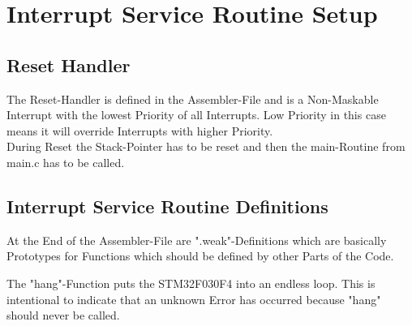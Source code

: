 \section{Interrupt Service Routine Setup}

\subsection{Reset Handler}

The Reset-Handler is defined in the Assembler-File and is a Non-Maskable Interrupt with the lowest Priority of all Interrupts.
Low Priority in this case means it will override Interrupts with higher Priority.\\
During Reset the Stack-Pointer has to be reset and then the main-Routine from main.c has to be called.



\subsection{Interrupt Service Routine Definitions}

At the End of the Assembler-File are ".weak"-Definitions which are basically Prototypes for Functions which should be defined by other Parts of the Code.



The "hang"-Function puts the STM32F030F4 into an endless loop. This is intentional to indicate that an unknown Error has occurred because "hang" should never be called.



\pagebreak
